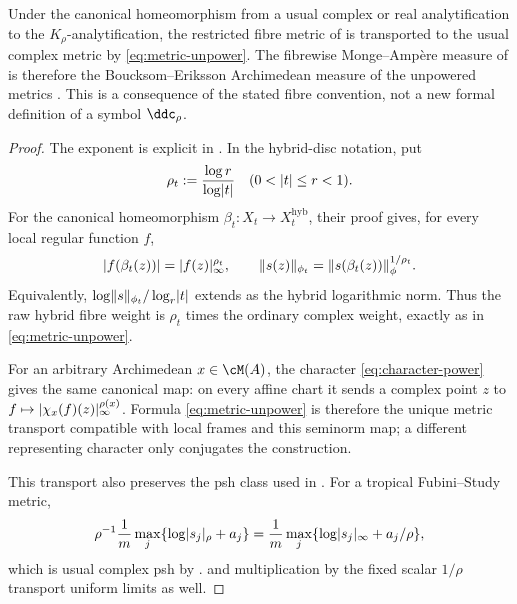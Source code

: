 \begin{lemma}
\label{lem:PS-transport}
Under the canonical homeomorphism from a usual complex or real
analytification to the $K_\rho$-analytification, the restricted fibre metric
of \cite[Proposition~3.2]{PS23Hybrid} is transported to the usual complex
metric by \eqref{eq:metric-unpower}.  The fibrewise Monge--Amp\`ere measure
of \cite[Definition~4.8]{PS23Hybrid} is therefore the Boucksom--Eriksson
Archimedean measure of the unpowered metrics
\cite[formula~(8.1) and Proposition~8.3]{BE21}.  This is a consequence of
the stated fibre convention, not a new formal definition of a symbol
$\ddc_\rho$.
\end{lemma}

\begin{proof}
The exponent is explicit in \cite[Proposition~3.2]{PS23Hybrid}.  In the
hybrid-disc notation, put
\[
 \rho_t:=\frac{\log r}{\log\lvert t\rvert}\quad(0<\lvert t\rvert\leq r<1).
\]
For the canonical homeomorphism $\beta_t:X_t\to X_t^{\mathrm{hyb}}$, their
proof gives, for every local regular function $f$,
\begin{equation}
 \lvert f(\beta_t(z))\rvert=\lvert f(z)\rvert_\infty^{\rho_t},
 \qquad
 \lVert s(z)\rVert_{\phi_t}
 =\lVert s(\beta_t(z))\rVert_{\phi}^{1/\rho_t}.
\label{eq:PS32-transport}
\end{equation}
Equivalently,
$\log\lVert s\rVert_{\phi_t}/\log_r\lvert t\rvert$
extends as the hybrid logarithmic norm.  Thus the raw hybrid fibre weight is
$\rho_t$ times the ordinary complex weight, exactly as in
\eqref{eq:metric-unpower}.

For an arbitrary Archimedean $x\in\cM(A)$, the character
\eqref{eq:character-power} gives the same canonical map: on every affine
chart it sends a complex point $z$ to
$f\mapsto\lvert\chi_x(f)(z)\rvert_\infty^{\rho(x)}$.  Formula
\eqref{eq:metric-unpower} is therefore the unique metric transport compatible
with local frames and this seminorm map; a different representing character
only conjugates the construction.

This transport also preserves the psh class used in \cite{PS23Hybrid}.  For
a tropical Fubini--Study metric,
\begin{equation}
 \rho^{-1}\frac1m\max_j
 \{\log\lvert s_j\rvert_\rho+a_j\}
 =\frac1m\max_j
 \{\log\lvert s_j\rvert_\infty+a_j/\rho\},
\label{eq:FS-transport}
\end{equation}
which is usual complex psh by \cite[Theorem~2.11]{PS23Hybrid}.
\cite[Proposition~2.21]{PS23Hybrid} and multiplication by the fixed scalar
$1/\rho$ transport uniform limits as well.


\end{proof}
